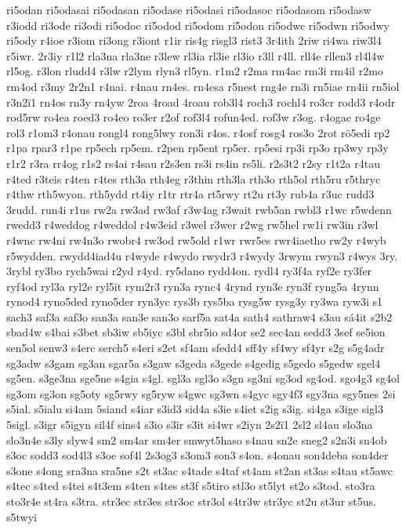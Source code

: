 {ri5odan
ri5odasai
ri5odasan
ri5odase
ri5odasi
ri5odasoc
ri5odasom
ri5odasw
r3iodd
ri3ode
ri3odi
ri5odoc
ri5odod
ri5odom
ri5odon
ri5odwc
ri5odwn
ri5odwy
ri5ody
r4ioe
r3iom
ri3ong
r3iont
r1ir
ris4g
risgl3
rist3
3r4ith
2riw
ri4wa
riw3l4
r5iwr.
2r3iy
r1l2
rla3na
rla3ne
r3lew
rl3ia
rl3ie
rl3io
r3ll
r4ll.
rll4e
rllen3
rl4l4w
rl5og.
r3lon
rludd4
r3lw
r2lym
rlyn3
rl5yn.
r1m2
r2ma
rm4ac
rm3i
rm4il
r2mo
rm4od
r3my
2r2n1
r4nai.
r4nau
rn4es.
rn4esa
r5nest
rng4e
rn3i
rn5iae
rn4ii
rn5iol
r3n2^^ef1
rn4os
rn3y
rn4yw
2roa
4road
4roau
rob3l4
roch3
rochl4
ro3cr
rodd3
r4odr
rod5rw
ro4ea
roed3
ro4eo
ro3er
r2of
rof3l4
rofun4ed.
rof3w
r3og.
r4ogae
ro4ge
rol3
r1om3
r4onau
rongl4
rong5lwy
ron3i
r4os.
r4osf
rosg4
ros3o
2rot
r^^f65edi
rp2
r1pa
rpar3
r1pe
rp5ech
rp5em.
r2pen
rp5ent
rp5er.
rp5esi
rp3i
rp3o
rp3wy
rp3y
r1r2
r3ra
rr4og
r1s2
rs4ai
r4sau
r2s3en
rs3i
rs4in
rs5li.
r2s3t2
r2sy
r1t2a
r4tau
r4ted
r3teis
r4ten
r4tes
rth3a
rth4eg
r3thin
rth3la
rth3o
rth5ol
rth5ru
r5thryc
r4thw
rth5wyon.
rth5ydd
rt4iy
r1tr
rtr4a
rt5rwy
rt2u
rt3y
rub4a
r3uc
rudd3
3rudd.
run4i
r1us
rw2a
rw3ad
rw3af
r3w4ag
r3wait
rwb5an
rwbl3
r1wc
r5wdenn
rwedd3
r4weddog
r4weddol
r4w3eid
r3wel
r3wer
r2wg
rw5hel
rw1i
rw3in
r3wl
r4wnc
rw4ni
rw4n3o
rwobr4
rw3od
rw5old
r1wr
rwr5es
rwr4iaetho
rw2y
r4wyb
r5wydden.
rwydd4iad4u
r4wyde
r4wydo
rwydr3
r4wydy
3rwym
rwyn3
r4wys
3ry.
3rybl
ry3bo
rych5wai
r2yd
r4yd.
ry5dano
rydd4on.
rydl4
ry3f4a
ryf2e
ry3fer
ryf4od
ryl3a
ryl2e
ryl5it
rym2r3
ryn3a
rync4
4rynd
ryn3e
ryn3f
ryng5a
4rynn
rynod4
ryno5ded
ryno5der
ryn3yc
rys3b
rys5ba
rysg5w
rysg3y
ry3wa
ryw3i
s1
sach3
saf3a
saf3o
san3a
san3e
san3o
sarf5a
sat4a
sath4
sathraw4
s3au
s^^e14it
s2b2
sbad4w
s4bai
s3bet
sb3iw
sb5iyc
s3bl
sbr5io
sd4or
se2
sec4an
sedd3
3sef
se5ion
sen5ol
senw3
s4erc
serch5
s4eri
s2et
sf4am
sfedd4
sff4y
sf4wy
sf4yr
s2g
s5g4adr
sg3adw
s3gam
sg3an
sgar5a
s3gaw
s3geda
s3gede
s4gedig
s5gedo
s5gedw
sgel4
sg5en.
s3ge3na
sge5ne
s4gia
s4gl.
sgl3a
sgl3o
s3gn
sg3ni
sg3od
sg4od.
sgo4g3
sg4ol
sg3om
sg3on
sg5oty
sg5rwy
sg5ryw
s4gwc
sg3wn
s4gyc
sgy4f3
sgy3na
sgy5nes
2si
s5ial.
s5ialu
si4am
5siand
s4iar
s3id3
sid4a
s3ie
s4iet
s2ig
s3ig.
si4ga
s3ige
sigl3
5sigl.
s3igr
s5igyn
sil4f
sins4
s3io
s3ir
s3it
si4wr
s2iyn
2s2^^ef1
2sl2
sl4au
slo3na
slo3n4e
s3ly
slyw4
sm2
sm4ar
sm4er
smwyt5haso
s4nau
sn2e
sneg2
s2n3i
sn4ob
s3oc
sodd3
sod4l3
s3oe
sof4l
2s3og3
s3om3
son3
s4on.
s4onau
son4deba
son4der
s3one
s4ong
sra3na
sra5ne
s2t
st3ac
s4tade
s4taf
st4am
st2an
st3as
s4tau
st5awc
s4tec
s4ted
s4tei
s4t3em
s4ten
s4tes
st3f
s5tiro
stl3o
st5lyt
st2o
s3tod.
sto3ra
sto3r4e
st4ra
s3tra.
str3ec
str3es
str3oc
str3ol
s4tr3w
str3yc
st2u
st3ur
st5us.
s5twyi
}
